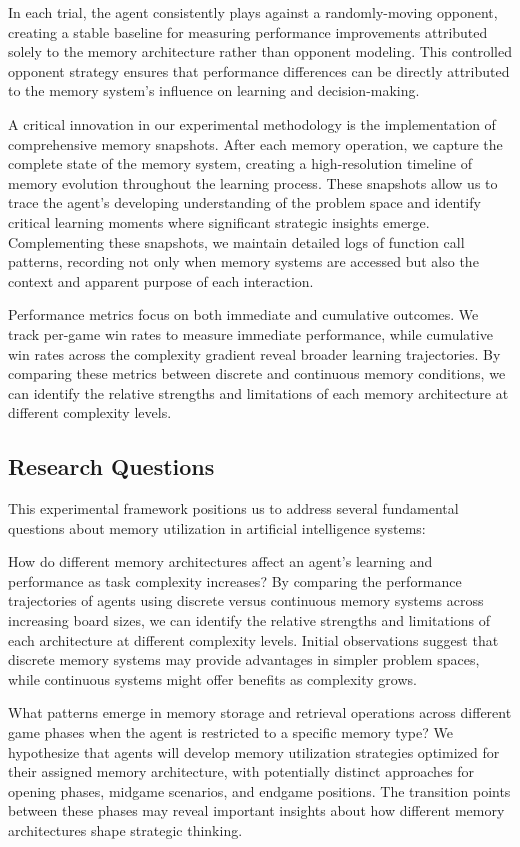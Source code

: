 \documentclass{article}
\begin{document}
In each trial, the agent consistently plays against a randomly-moving opponent, creating a stable baseline for measuring performance improvements attributed solely to the memory architecture rather than opponent modeling. This controlled opponent strategy ensures that performance differences can be directly attributed to the memory system's influence on learning and decision-making.

A critical innovation in our experimental methodology is the implementation of comprehensive memory snapshots. After each memory operation, we capture the complete state of the memory system, creating a high-resolution timeline of memory evolution throughout the learning process. These snapshots allow us to trace the agent's developing understanding of the problem space and identify critical learning moments where significant strategic insights emerge. Complementing these snapshots, we maintain detailed logs of function call patterns, recording not only when memory systems are accessed but also the context and apparent purpose of each interaction.

Performance metrics focus on both immediate and cumulative outcomes. We track per-game win rates to measure immediate performance, while cumulative win rates across the complexity gradient reveal broader learning trajectories. By comparing these metrics between discrete and continuous memory conditions, we can identify the relative strengths and limitations of each memory architecture at different complexity levels.

\subsection{Research Questions}

This experimental framework positions us to address several fundamental questions about memory utilization in artificial intelligence systems:

How do different memory architectures affect an agent's learning and performance as task complexity increases? By comparing the performance trajectories of agents using discrete versus continuous memory systems across increasing board sizes, we can identify the relative strengths and limitations of each architecture at different complexity levels. Initial observations suggest that discrete memory systems may provide advantages in simpler problem spaces, while continuous systems might offer benefits as complexity grows.

What patterns emerge in memory storage and retrieval operations across different game phases when the agent is restricted to a specific memory type? We hypothesize that agents will develop memory utilization strategies optimized for their assigned memory architecture, with potentially distinct approaches for opening phases, midgame scenarios, and endgame positions. The transition points between these phases may reveal important insights about how different memory architectures shape strategic thinking.
\end{document}
